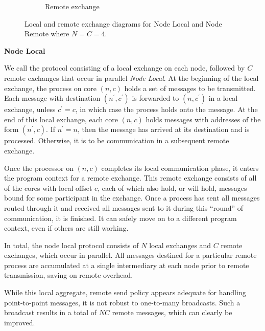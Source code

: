 \documentclass[10]{report}
\begin{document}
\begin{figure}
\begin{center}
\begin{subfigure}{0.53\linewidth}
			\caption{Remote exchange \label{fig:remote_exchange}}
		\end{subfigure}
		\caption{Local and remote exchange diagrams for Node Local and Node Remote where $N = C = 4$. \label{fig:exchange}}
	\end{center}
\end{figure}


\bigskip
\noindent
\textbf{Node Local}

\noindent
We call the protocol consisting of a local exchange on each node, followed by $C$ remote exchanges that occur in parallel \emph{Node Local}.
%
%
At the beginning of the local exchange, the process on core $(n,c)$ holds a set of messages to be transmitted.
Each message with destination $(n^\prime, c^\prime)$ is forwarded to $(n, c^\prime)$ in a local exchange, unless $c^\prime = c$, in which case the process holds onto the message.
At the end of this local exchange, each core $(n,c)$ holds messages with addresses of the form $(n^\prime, c)$.
If $n^\prime = n$, then the message has arrived at its destination and is processed. 
Otherwise, it is to be communication in a subsequent remote exchange.

Once the processor on $(n, c)$ completes its local communication phase, it enters the program context for a remote exchange.
This remote exchange consists of all of the cores with local offset $c$, each of which also hold, or will hold, messages bound for some participant in the exchange.
Once a process has sent all messages routed through it and received all messages sent to it during this ``round'' of communication, it is finished. 
It can safely move on to a different program context, even if others are still working. 

In total, the node local protocol consists of $N$ local exchanges and $C$ remote exchanges, which occur in parallel. 
All messages destined for a particular remote process are accumulated at a single intermediary at each node prior to remote transmission, saving on remote overhead.

While this local aggregate, remote send policy appears adequate for handling point-to-point messages, it is not robust to one-to-many broadcasts.
Such a broadcast results in a total of $NC$ remote messages, which can clearly be improved. 
\end{document}
